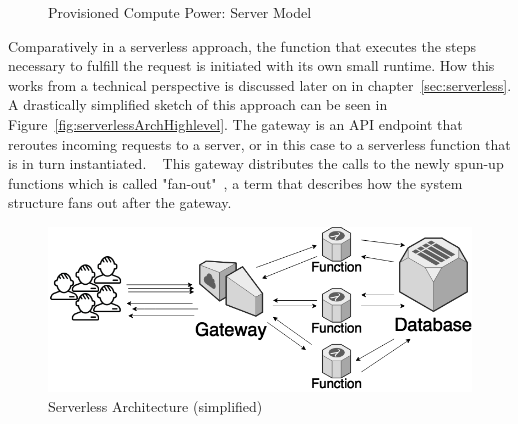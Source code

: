 \begin{figure}[ht]
    \centering
    \caption {Provisioned Compute Power: Server Model}
    \label{graph:provisionedComputePowerServer}
\end{figure}

Comparatively in a serverless approach, the function that executes the steps necessary to fulfill the request is initiated with its own small runtime. How this works from a technical perspective is discussed later on in chapter~\vref{sec:serverless}. A drastically simplified sketch of this approach can be seen in Figure~\vref{fig:serverlessArchHighlevel}. The gateway is an API endpoint that reroutes incoming requests to a server, or in this case to a serverless function that is in turn instantiated. ~ 
This gateway distributes the calls to the newly spun-up functions which is called "fan-out"~, a term that describes how the system structure fans out after the gateway.

\begin{figure}[ht]
    \includegraphics[width=\linewidth]{images/drawio/lambda.png}\centering
    \caption {Serverless Architecture (simplified)}
    \label{fig:serverlessArchHighlevel}
\end{figure}

